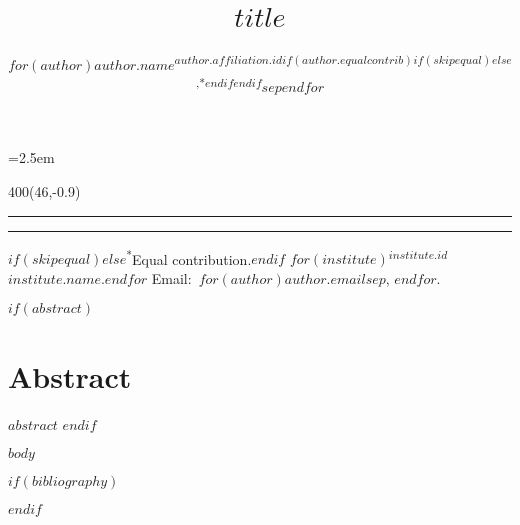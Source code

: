 \documentclass[letterpaper,twocolumn]{article}
\title{%
  \vspace{-5ex}%
  \begin{minipage}{\textwidth}%
    \begin{flushleft}%
      {\normalfont\Huge $title$}%
    \end{flushleft}%
  \end{minipage}%
  \vspace{-2ex}%
}
\author{%
  \begin{minipage}{\textwidth}%
    \begin{flushleft}%
      \hspace{-0.5em}%
      {%
        \normalfont\large\scshape%
        $for(author)$$author.name$\textsuperscript{$author.affiliation.id$$if(author.equalcontrib)$$if(skipequal)$$else$,*$endif$$endif$}$sep$\quad $endfor$%
      }%
    \end{flushleft}%
  \end{minipage}%
  \vspace{4ex}%
}
\date{}
\begin{document}
\nowidow[2]
\parindent=2.5em

\maketitle
\thispagestyle{fancy}

\textblockorigin{0in}{11in}
\setlength{\TPHorizModule}{1pt}
\setlength{\TPVertModule}{1in}
\begin{textblock}{400}(46,-0.9)
    \parindent=0pt
    \normalfont\scriptsize\raggedright

    \hrule
    \hrule
    \vspace{1.5ex}

    $if(skipequal)$$else$\textsuperscript{*}Equal contribution.$endif$
    $for(institute)$\textsuperscript{$institute.id$}$institute.name$.$endfor$
    Email:~$for(author)$\texttt{$author.email$}$sep$, $endfor$.
\end{textblock}

$if(abstract)$
\section*{Abstract}
$abstract$
$endif$

$body$

$if(bibliography)$
\footnotesize


$endif$
\end{document}
